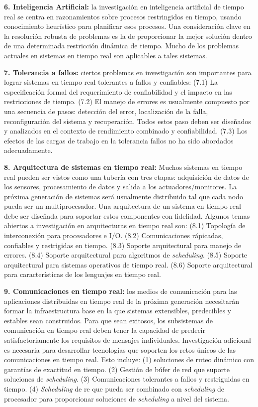 \textbf{6. Inteligencia Artificial:} la investigación en inteligencia artificial de tiempo real se centra en razonamientos sobre procesos restringidos en tiempo, usando conocimiento heurístico para planificar esos procesos. Una consideración clave en la resolución robusta de problemas es la de  proporcionar la mejor solución dentro de una determinada restricción dinámica de tiempo. Mucho de los problemas actuales en sistemas en tiempo real son aplicables a tales sistemas. 

\textbf{7. Tolerancia a fallos:} ciertos problemas en investigación son importantes para lograr sistemas en tiempo real tolerantes a fallos y confiables: (7.1) La especificación formal del requerimiento de confiabilidad y el impacto en las restricciones de tiempo. (7.2) El manejo de errores es usualmente compuesto por una secuencia de pasos: detección del error, localización de la falla, reconfiguración del sistema y recuperación. Todos estos paso deben ser diseñados y analizados en el contexto de rendimiento combinado y confiabilidad. (7.3) Los efectos de las cargas de trabajo en la tolerancia fallos no ha sido abordados adecuadamente. 

\textbf{8. Arquitectura de sistemas en tiempo real:} Muchos sistemas en tiempo real pueden ser vistos como una tubería con tres etapas: adquisición de datos de los sensores, procesamiento de datos y salida a los actuadores/monitores. La próxima generación de sistemas será usualmente distribuido tal que cada nodo pueda ser un multiprocesador. Una arquitectura de un sistema en tiempo real debe ser diseñada para soportar estos componentes con fidelidad. Algunos temas abiertos a investigación en arquitecturas en tiempo real son: (8.1) Topología de interconexión para procesadores e I/O. (8.2) Comunicaciones rápicadas, confiables y restrigidas en tiempo. (8.3) Soporte arquitectural para manejo de errores. (8.4) Soporte arquitectural para algoritmos de \emph{scheduling}. (8.5) Soporte arquitectural para sistemas operativos de tiempo real. (8.6) Soporte arquitectural para características de los lenguajes en tiempo real. 

\textbf{9. Comunicaciones en tiempo real:} los medios de comunicación para las aplicaciones distribuidas en tiempo real de la próxima generación necesitarán formar la infraestructura base en la que sistemas extensibles, predecibles y estables sean construidos. Para que sean exitosos, los subsistemas de comunicación en tiempo real deben tener la capacidad de predecir satisfactoriamente los requisitos de mensajes individuales. Investigación adicional es necesaria para desarrollar tecnologías que soporten los retos únicos de las comunicaciones en tiempo real. Esto incluye: (1) soluciones de ruteo dinámico con garantías de exactitud en tiempo. (2) Gestión de búfer de red que suporte soluciones de \emph{scheduling}. (3) Comunicaciones tolerantes a fallos y restriguidas en tiempo. (4) \emph{Scheduling} de re que pueda ser combinado con \emph{scheduling} de procesador para proporcionar soluciones de \emph{scheduling} a nivel del sistema. 

